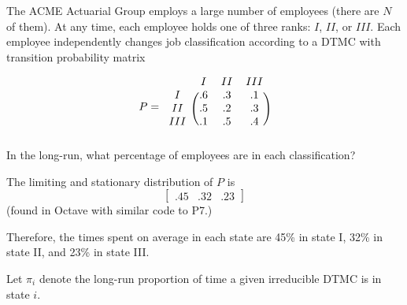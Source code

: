 \documentclass[10pt,a4paper]{exam}
\begin{document}
\begin{questions}
\question The ACME Actuarial Group employs a large number of employees (there are $N$ of them). At any time, each employee holds one of three ranks: $I$, $II$, or $III$. Each employee independently changes job classification according to a DTMC with transition probability matrix

$$P = \begin{blockarray}{cccc}
& I & II & III\\
\begin{block}{c(ccc)}
I & .6 & .3 & .1\\
II & .5 & .2 & .3\\
III & .1 & .5 & .4\\
\end{block}
\end{blockarray}$$
In the long-run, what percentage of employees are in each classification?

\begin{solution}
The limiting and stationary distribution of $P$ is
$$\begin{bmatrix}
.45 & .32 & .23
\end{bmatrix}$$
(found in Octave with similar code to P7.)

Therefore, the times spent on average in each state are 45\% in state I, 32\% in state II, and 23\% in state III.
\end{solution}

\pagebreak

\question Let $\pi_i$ denote the long-run proportion of time a given irreducible DTMC is in state $i$.
\end{questions}
\end{document}
